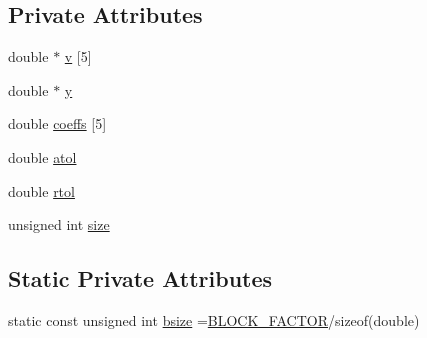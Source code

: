 \subsection*{Private Attributes}
\begin{DoxyCompactItemize}
\item 
double $\ast$ \hyperlink{classodes_1_1RPP2_a7d2380ce59f91fc9f17515def88ec8b3}{v} \mbox{[}5\mbox{]}
\item 
double $\ast$ \hyperlink{classodes_1_1RPP2_a0e3a828108fc0402fd9701866043d3f4}{y}
\item 
double \hyperlink{classodes_1_1RPP2_afa694ed8ed7856b02bfba9d769fbe23a}{coeffs} \mbox{[}5\mbox{]}
\item 
double \hyperlink{classodes_1_1RPP2_a210e64e297a71aad445df73a24f6d3ca}{atol}
\item 
double \hyperlink{classodes_1_1RPP2_ad264a1accdc065b7553cc79366af2579}{rtol}
\item 
unsigned int \hyperlink{classodes_1_1RPP2_ad771c8666aed14f8cc5dc5f1c88bb624}{size}
\end{DoxyCompactItemize}
\subsection*{Static Private Attributes}
\begin{DoxyCompactItemize}
\item 
static const unsigned int \hyperlink{classodes_1_1RPP2_a179acb63d58032d8ba8554705abcbc8c}{bsize} =\hyperlink{MacrosForCompilers_8hpp_aaa395acf51db19a6192e10ccd3c47fa2}{B\-L\-O\-C\-K\-\_\-\-F\-A\-C\-T\-O\-R}/sizeof(double)
\end{DoxyCompactItemize}


